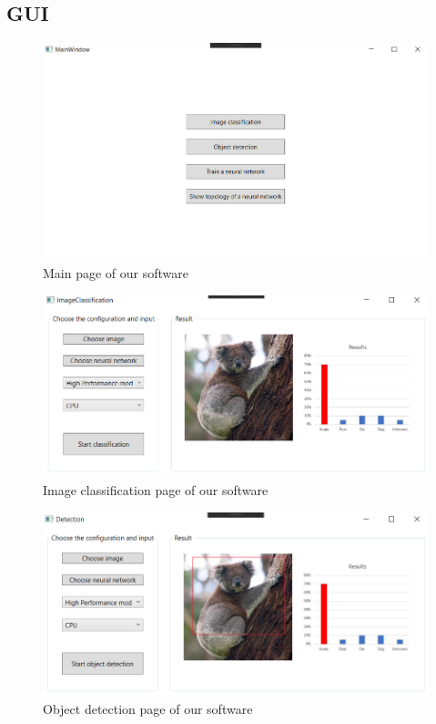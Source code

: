 \documentclass[parskip=full]{scrartcl}
\begin{document}
\subsection{GUI}
\begin{figure}[htb!]\centering
\includegraphics[width=\textwidth]{MainPageGUI}
\caption{Main page of our software}
\end{figure}
\begin{figure}[htb!]\centering
\includegraphics[width=\textwidth]{ImageClassificationGUI}
\caption{Image classification page of our software}
\end{figure}
\begin{figure}[htb!]\centering
\includegraphics[width=\textwidth]{DetectionGUI}
\caption{Object detection page of our software}
\end{figure}
\end{document}
